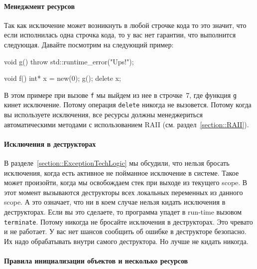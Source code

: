 \paragraph{Менеджмент ресурсов}

Так как исключение может возникнуть в любой строчке кода то это значит, что если исполнилась одна строчка кода, то у вас нет гарантии, что выполнится следующая.
Давайте посмотрим на следующий пример:
\begin{cppcode}
void g() {
  throw std::runtime_error("Ups!");
}

void f() {
  int* x = new(0);
  g();
  delete x;
}
\end{cppcode}
В этом примере при вызове \verb"f" мы выйдем из нее в строчке~7, где функция \verb"g" кинет исключение.
Потому операция \verb"delete" никогда не вызовется.
Потому когда вы используете исключения, все ресурсы должны менеджериться автоматическими методами с использованием RAII (см. раздел~\ref{section::RAII}).

\paragraph{Исключения в деструкторах}

В разделе~\ref{section::ExceptionTechLogic} мы обсудили, что нельзя бросать исключения, когда есть активное не пойманное исключение в системе.
Такое может произойти, когда мы освобождаем стек при выходе из текущего scope.
В этот момент вызываются деструкторы всех локальных переменных из данного scope.
А это означает, что ни в коем случае нельзя кидать исключения в деструкторах.
Если вы это сделаете, то программа упадет в run-time вызовом \verb"terminate".
Потому никогда не бросайте исключения в деструкторах.
Это чревато и не работает.
У вас нет шансов сообщить об ошибке в деструкторе безопасно.
Их надо обрабатывать внутри самого деструктора.
Но лучше не кидать никогда.

\paragraph{Правила инициализации объектов и несколько ресурсов}

